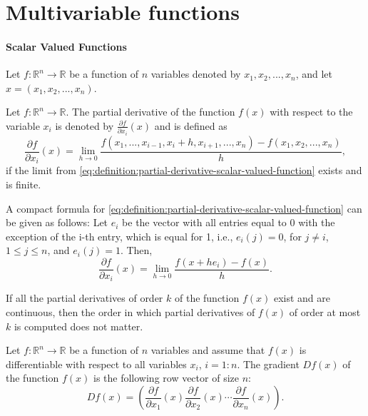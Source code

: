 \section{Multivariable functions}
\paragraph{Scalar Valued Functions}
Let $ f : \mathbb{R}^n \rightarrow \mathbb{R} $ be a function of $ n $ variables
    denoted by $ x_1, x_2, ..., x_n $, and let $ x = (x_1, x_2, ..., x_n) $.

\begin{definition}
    Let $ f : \mathbb{R}^n \rightarrow \mathbb{R} $.
    The partial derivative of the function $ f(x) $ with respect to the variable
        $ x_i $ is denoted by $ \frac{\partial f}{\partial x_i} (x) $ and is
        defined as
    \begin{equation}
        \frac{\partial f}{\partial x_i} (x) = \lim_{h \rightarrow 0}
            \frac{f(x_1, ..., x_{i - 1}, x_i + h, x_{i + 1}, ..., x_n) -
            f(x_1, x_2, ..., x_n)}{h},
        \label{eq:definition:partial-derivative-scalar-valued-function}
    \end{equation}
    if the limit from \eqref{eq:definition:partial-derivative-scalar-valued-function}
        exists and is finite.
\end{definition}

A compact formula for \eqref{eq:definition:partial-derivative-scalar-valued-function}
    can be given as follows:
Let $ e_i $ be the vector with all entries equal to 0 with the exception of the
    i-th entry, which is equal for 1, i.e., $ e_i(j) = 0 $, for $ j \neq i $,
    $ 1 \leq j \leq n $, and $ e_i(j) = 1 $. Then,
\begin{equation*}
    \frac{\partial f}{\partial x_i}(x) = \lim_{h \rightarrow 0}
        \frac{f(x + h e_i) - f(x)}{h}.
\end{equation*}

\begin{theorem}
    If all the partial derivatives of order $ k $ of the function $ f(x) $ exist
        and are continuous, then the order in which partial derivatives of
        $ f(x) $ of order at most $ k $ is computed does not matter.
\end{theorem}

\begin{definition}
    Let $ f : \mathbb{R}^n \rightarrow \mathbb{R} $ be a function of $ n $
        variables and assume that $ f(x) $ is differentiable with respect to all
        variables $ x_i $, $ i = 1 : n $.
    The gradient $ D f(x) $ of the function $ f(x) $ is the following row vector
        of size $ n $:
    \begin{equation}
        D f(x) = \left( \frac{\partial f}{\partial x_1} (x)
            \frac{\partial f}{\partial x_2} (x) \cdots
            \frac{\partial f}{\partial x_n} (x) \right).
        \label{eq:definition:partial-derivative-scalar-valued-function-gradient}
    \end{equation}
\end{definition}


